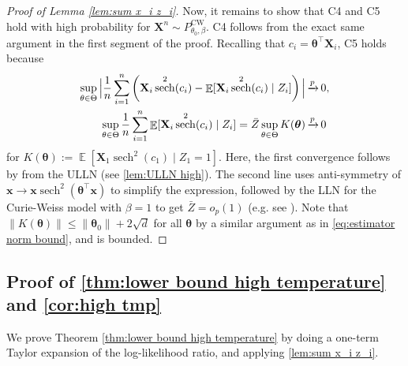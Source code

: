 \documentclass[preprint,reqno]{imsart}
\newcommand{\ttheta}{\boldsymbol{\theta}}
\DeclareMathOperator{\xp}{\xrightarrow{\mathnormal p}}
\DeclareMathOperator{\sech}{sech}
\DeclareMathOperator{\EE}{\mathbb{E}}
\newcommand{\x}{\mathbf{x}}
\newcommand{\X}{\mathbf{X}}
\DeclareMathOperator{\sumin}{\sum_{\mathnormal i=1}^{\mathnormal n}}
\begin{document}
\begin{proof}[Proof of Lemma \ref{lem:sum x_i z_i}]
    Now, it remains to show that C4 and C5 hold with high probability for $\X^n \sim P_{\theta_0,\beta}^{\text{CW}}$. C4 follows from the exact same argument in the first segment of the proof. Recalling that $c_i = \ttheta^\top \X_i$, C5 holds because
    \begin{equation*}%
    \begin{aligned}
        \sup_{\theta \in \Theta} \Big|\frac{1}{n}\sumin \left(\X_i \sech^2(c_i) - \EE[\X_i \sech^2(c_i) \mid Z_i] \right) \Big| &\xp 0, \\
        \sup_{\theta \in \Theta} \frac{1}{n}\sumin \EE[\X_i \sech^2(c_i) \mid Z_i] = \bar{Z} \sup_{\theta \in \Theta} K(\ttheta) &\xp 0
    \end{aligned}
    \end{equation*}
    for $K(\ttheta) := \EE[\X_1 \sech^2(c_1) \mid Z_1 = 1]$. 
    Here, the first convergence follows by from the ULLN (see \cref{lem:ULLN high}). The second line uses anti-symmetry of $\x \to \x \sech^2(\ttheta^\top \x)$ to simplify the expression, followed by the LLN for the Curie-Weiss model with $\beta = 1$ to get $\bar{Z} = o_p(1)$ (e.g. see \cite{ellis1978statistics}). Note that $\|K(\ttheta)\| \le \|\ttheta_0\| + 2\sqrt{d}$ for all $\ttheta$ by a similar argument as in \eqref{eq:estimator norm bound}, and is bounded.
\end{proof}

%
%
%
%
%


\subsection{Proof of \cref{thm:lower bound high temperature} and \cref{cor:high tmp}}\label{sec:proof high tmp}
We prove Theorem \ref{thm:lower bound high temperature} by doing a one-term Taylor expansion of the log-likelihood ratio, and applying \cref{lem:sum x_i z_i}. %
\end{document}
